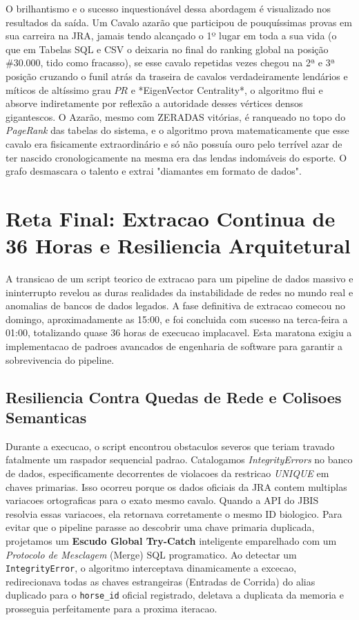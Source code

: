 \documentclass[12pt,a4paper]{article}
\begin{document}
O brilhantismo e o sucesso inquestionável dessa abordagem é visualizado nos resultados da saída. Um Cavalo azarão que participou de pouquíssimas provas em sua carreira na JRA, jamais tendo alcançado o 1º lugar em toda a sua vida (o que em Tabelas SQL e CSV o deixaria no final do ranking global na posição \#30.000, tido como fracasso), se esse cavalo repetidas vezes chegou na 2ª e 3ª posição cruzando o funil atrás da traseira de cavalos verdadeiramente lendários e míticos de altíssimo grau $PR$ e *EigenVector Centrality*, o algoritmo flui e absorve indiretamente por reflexão a autoridade desses vértices densos gigantescos. O Azarão, mesmo com ZERADAS vitórias, é ranqueado no topo do \textit{PageRank} das tabelas do sistema, e o algoritmo prova matematicamente que esse cavalo era fisicamente extraordinário e só não possuía ouro pelo terrível azar de ter nascido cronologicamente na mesma era das lendas indomáveis do esporte. O grafo desmascara o talento e extrai "diamantes em formato de dados".


\section{Reta Final: Extracao Continua de 36 Horas e Resiliencia Arquitetural}

A transicao de um script teorico de extracao para um pipeline de dados massivo e ininterrupto revelou as duras realidades da instabilidade de redes no mundo real e anomalias de bancos de dados legados. A fase definitiva de extracao comecou no domingo, aproximadamente as 15:00, e foi concluida com sucesso na terca-feira a 01:00, totalizando quase 36 horas de execucao implacavel. Esta maratona exigiu a implementacao de padroes avancados de engenharia de software para garantir a sobrevivencia do pipeline.

\subsection{Resiliencia Contra Quedas de Rede e Colisoes Semanticas}
Durante a execucao, o script encontrou obstaculos severos que teriam travado fatalmente um raspador sequencial padrao. Catalogamos \textit{IntegrityErrors} no banco de dados, especificamente decorrentes de violacoes da restricao \textit{UNIQUE} em chaves primarias. Isso ocorreu porque os dados oficiais da JRA contem multiplas variacoes ortograficas para o exato mesmo cavalo. Quando a API do JBIS resolvia essas variacoes, ela retornava corretamente o mesmo ID biologico. Para evitar que o pipeline parasse ao descobrir uma chave primaria duplicada, projetamos um \textbf{Escudo Global Try-Catch} inteligente emparelhado com um \textit{Protocolo de Mesclagem} (Merge) SQL programatico. Ao detectar um \texttt{IntegrityError}, o algoritmo interceptava dinamicamente a excecao, redirecionava todas as chaves estrangeiras (Entradas de Corrida) do alias duplicado para o \texttt{horse\_id} oficial registrado, deletava a duplicata da memoria e prosseguia perfeitamente para a proxima iteracao.
\end{document}
